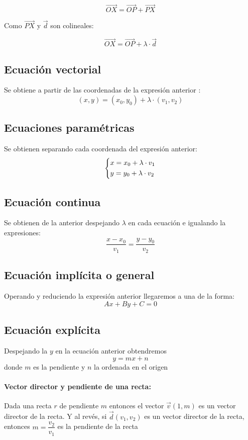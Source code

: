 \documentclass[a4paper,spanish,9pt]{extarticle}
\begin{document}
\begin{multicols*}{2}

$$\overrightarrow{OX}=\overrightarrow{OP}+\overrightarrow{PX} $$ 

Como $\overrightarrow{PX}$ y $\overrightarrow{d}$ son colineales:

$$\overrightarrow{OX}=\overrightarrow{OP}+\lambda\cdot\overrightarrow{d} $$ 

\subsection{Ecuación vectorial}
Se obtiene a partir de las coordenadas de la expresión anterior :
$$(x,y)=(x_0,y_0)+\lambda\cdot(v_1,v_2)$$

\subsection{Ecuaciones paramétricas}
Se obtienen separando cada coordenada del expresión anterior:
$$\left\lbrace \begin{gathered}
  x = x_0 + \lambda\cdot v_1 \hfill \\
  y = y_0 + \lambda\cdot v_2 \hfill \\ 
\end{gathered}  \right.
$$
 
\subsection{Ecuación continua}
Se obtienen de la anterior despejando $\lambda$ en cada ecuación e igualando la expresiones:
$$ \dfrac{x-x_0}{v_1}=\dfrac{y-y_0}{v_2}$$

\subsection{Ecuación implícita o general}
Operando y reduciendo la expresión anterior llegaremos a una de la forma:
$$Ax+By+C=0$$

\subsection{Ecuación explícita}
Despejando la $y$ en la ecuación anterior obtendremos
$$y=mx+n$$
donde $m$ es la pendiente y $n$ la ordenada en el origen
\paragraph*{Vector director y pendiente de una recta:} 
Dada una recta $r$ de pendiente $m$ entonces el vector $\overrightarrow{v}(1,m)$ es un vector director de la recta. Y al revés, si $\overrightarrow{d}(v_1,v_2)$ es un vector director de la recta, entonces $m=\dfrac{v_2}{v_1}$ es la pendiente de la recta 


\end{multicols*}
\end{document}
